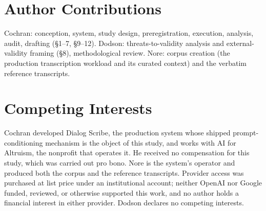 \documentclass[11pt]{article}
\begin{document}
\section*{Author Contributions}

Cochran: conception, system, study design, preregistration, execution, analysis, audit, drafting (\S1--7, \S9--12). Dodson: threats-to-validity analysis and external-validity framing (\S8), methodological review. Nore: corpus creation (the production transcription workload and its curated context) and the verbatim reference transcripts.

\section*{Competing Interests}

Cochran developed Dialog Scribe, the production system whose shipped prompt-conditioning mechanism is the object of this study, and works with AI for Altruism, the nonprofit that operates it. He received no compensation for this study, which was carried out pro bono. Nore is the system's operator and produced both the corpus and the reference transcripts. Provider access was purchased at list price under an institutional account; neither OpenAI nor Google funded, reviewed, or otherwise supported this work, and no author holds a financial interest in either provider. Dodson declares no competing interests.


\end{document}

